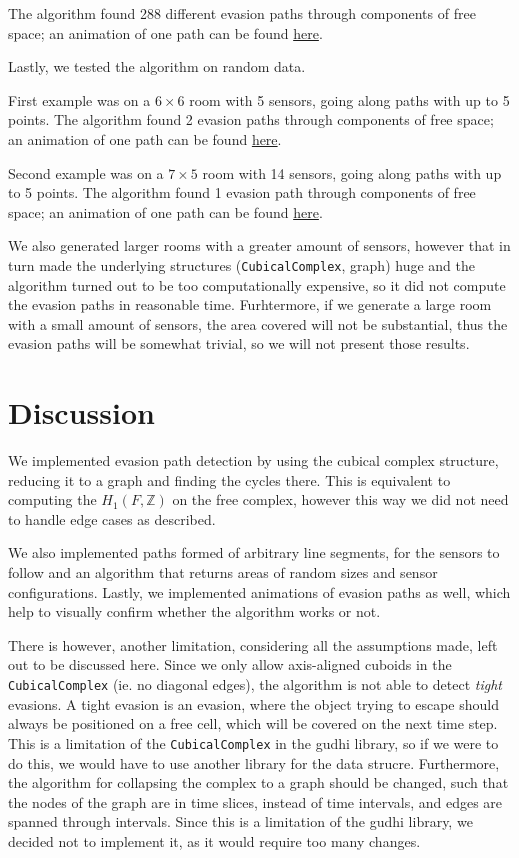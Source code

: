 \documentclass{article}
\begin{document}
The algorithm found 288 different evasion paths through components of free space; an animation of one path can be found \href{https://github.com/MOj0/TDA_Evasion/blob/main/report/example.gif}{here}.

\bigskip

Lastly, we tested the algorithm on random data.

First example was on a $6 \times 6$ room with 5 sensors, going along paths with up to 5 points.
The algorithm found 2 evasion paths through components of free space; an animation of one path can be found \href{https://github.com/MOj0/TDA_Evasion/blob/main/report/random_6x6.gif}{here}.

Second example was on a $7 \times 5$ room with 14 sensors, going along paths with up to 5 points.
The algorithm found 1 evasion path through components of free space; an animation of one path can be found \href{https://github.com/MOj0/TDA_Evasion/blob/main/report/random_7x5.gif}{here}.

We also generated larger rooms with a greater amount of sensors, however that in turn made the underlying structures (\texttt{CubicalComplex}, graph) huge and the algorithm turned out to be too computationally expensive, so it did not compute the evasion paths in reasonable time.
Furhtermore, if we generate a large room with a small amount of sensors, the area covered will not be substantial, thus the evasion paths will be somewhat trivial, so we will not present those results.


\section{Discussion}

We implemented evasion path detection by using the cubical complex structure, reducing it to a graph and finding the cycles there.
This is equivalent to computing the $ H_1(F, \mathbb{Z})$ on the free complex, however this way we did not need to handle edge cases as described.

We also implemented paths formed of arbitrary line segments, for the sensors to follow and an algorithm that returns areas of random sizes and sensor configurations.
Lastly, we implemented animations of evasion paths as well, which help to visually confirm whether the algorithm works or not.

There is however, another limitation, considering all the assumptions made, left out to be discussed here.
Since we only allow axis-aligned cuboids in the \texttt{CubicalComplex} (ie. no diagonal edges), the algorithm is not able to detect \textit{tight} evasions.
A tight evasion is an evasion, where the object trying to escape should always be positioned on a free cell, which will be covered on the next time step.
This is a limitation of the \texttt{CubicalComplex} in the gudhi library, so if we were to do this, we would have to use another library for the data strucre.
Furthermore, the algorithm for collapsing the complex to a graph should be changed, such that the nodes of the graph are in time slices, instead of time intervals, and edges are spanned through intervals.
Since this is a limitation of the gudhi library, we decided not to implement it, as it would require too many changes.
\end{document}
